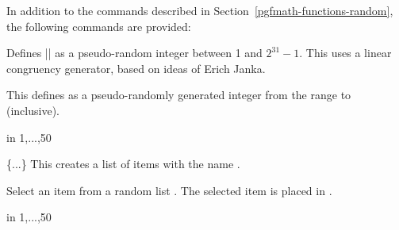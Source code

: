 \label{pgfmath-random}

In addition to the commands described in 
Section~\ref{pgfmath-functions-random}, 
the following commands are provided:

\begin{command}{\pgfmathgeneratepseudorandomnumber}
	Defines |\pgfmathresult| as a pseudo-random integer between 1 and 
	$2^{31}-1$. This uses a linear congruency generator, based on ideas
	of Erich Janka.
\end{command}

\begin{command}{\pgfmathrandominteger{}}
	This defines  as a pseudo-randomly generated integer from 
	the range  to  (inclusive).
	
\begin{codeexample}[]
\begin{pgfpicture}
   \foreach \x in {1,...,50}{
      \color{blue!40!white}
   }	  
\end{pgfpicture}
\end{codeexample}
\end{command}

\begin{command}{\pgfmathdeclarerandomlist{}\{...\}}
	This creates a list of items with the name .
\end{command}

\begin{command}{\pgfmathrandomitem{}}
	Select an item from a random list . The
	selected item is placed in .
\end{command}

\begin{codeexample}[]
\begin{pgfpicture}
   \foreach \a in {1,...,50}{
      \color{\c!40!white}
   }	  
\end{pgfpicture}
\end{codeexample}

